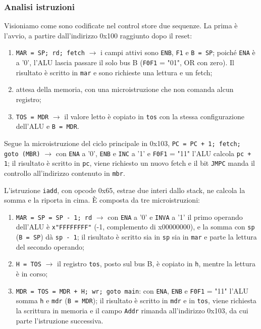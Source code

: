 

\subsubsection{Analisi istruzioni}
Visioniamo come sono codificate nel control store due sequenze. La prima è l'avvio, a partire dall'indirizzo 0x100 raggiunto dopo il reset:
\begin{enumerate}
  \item \texttt{MAR = SP; rd; fetch} $\rightarrow$ i campi attivi sono \texttt{ENB}, \texttt{F1} e \texttt{B = SP}; poiché \texttt{ENA} è a '0', l'ALU lascia passare il solo bus B (\texttt{F0F1} = "01", OR con zero). Il risultato è scritto in \texttt{mar} e sono richieste una lettura e un fetch;
  \item attesa della memoria, con una microistruzione che non comanda alcun registro;
  \item \texttt{TOS = MDR} $\rightarrow$ il valore letto è copiato in \texttt{tos} con la stessa configurazione dell'ALU e \texttt{B = MDR}.
\end{enumerate}
Segue la microistruzione del ciclo principale in 0x103, \texttt{PC = PC + 1; fetch; goto (MBR)} $\rightarrow$ con \texttt{ENA} a '0', \texttt{ENB} e \texttt{INC} a '1' e \texttt{F0F1} = "11" l'ALU calcola \texttt{pc + 1}; il risultato è scritto in \texttt{pc}, viene richiesto un nuovo fetch e il bit \texttt{JMPC} manda il controllo all'indirizzo contenuto in \texttt{mbr}.

L'istruzione \texttt{iadd}, con opcode 0x65, estrae due interi dallo stack, ne calcola la somma e la riporta in cima. È composta da tre microistruzioni:
\begin{enumerate}
  \item \texttt{MAR = SP = SP - 1; rd} $\rightarrow$ con \texttt{ENA} a '0' e \texttt{INVA} a '1' il primo operando dell'ALU è \texttt{x"FFFFFFFF"} (-1, complemento di x00000000), e la somma con \texttt{sp} (\texttt{B = SP}) dà \texttt{sp - 1}; il risultato è scritto sia in \texttt{sp} sia in \texttt{mar} e parte la lettura del secondo operando;
  \item \texttt{H = TOS} $\rightarrow$ il registro \texttt{tos}, posto sul bus B, è copiato in \texttt{h}, mentre la lettura è in corso;
  \item \texttt{MDR = TOS = MDR + H; wr; goto main}: con \texttt{ENA}, \texttt{ENB} e \texttt{F0F1} = "11" l'ALU somma \texttt{h} e \texttt{mdr} (\texttt{B = MDR}); il risultato è scritto in \texttt{mdr} e in \texttt{tos}, viene richiesta la scrittura in memoria e il campo \texttt{Addr} rimanda all'indirizzo 0x103, da cui parte l'istruzione successiva.
\end{enumerate}

